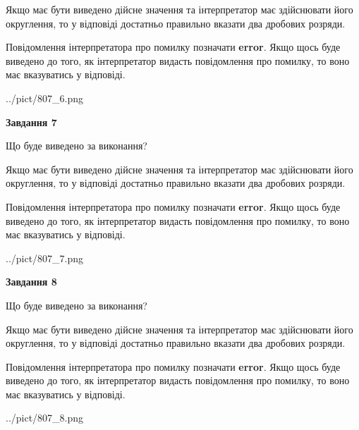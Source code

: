 \documentclass[12pt, ukrainian]{article}
\begin{document}
{\begin {Large}
Якщо має бути виведено дійсне значення та інтерпретатор має здійснювати його округлення, 
то у відповіді достатньо правильно вказати два дробових розряди.

Повідомлення інтерпретатора про помилку позначати \textbf{error}.
Якщо щось буде виведено до того, як інтерпретатор видасть повідомлення про помилку, 
то воно має вказуватись у відповіді. \par

\begin{center}
	{../pict/807_6.png}
\end{center}
\newpage

{\begin {center}\textbf{Завдання 7}\end {center}}\par
Що буде виведено за виконання? \par

Якщо має бути виведено дійсне значення та інтерпретатор має здійснювати його округлення, 
то у відповіді достатньо правильно вказати два дробових розряди.

Повідомлення інтерпретатора про помилку позначати \textbf{error}.
Якщо щось буде виведено до того, як інтерпретатор видасть повідомлення про помилку, 
то воно має вказуватись у відповіді. \par

\begin{center}
	{../pict/807_7.png}
\end{center}
\newpage

{\begin {center}\textbf{Завдання 8}\end {center}}\par
Що буде виведено за виконання? \par

Якщо має бути виведено дійсне значення та інтерпретатор має здійснювати його округлення, 
то у відповіді достатньо правильно вказати два дробових розряди.

Повідомлення інтерпретатора про помилку позначати \textbf{error}.
Якщо щось буде виведено до того, як інтерпретатор видасть повідомлення про помилку, 
то воно має вказуватись у відповіді. \par

\begin{center}
	{../pict/807_8.png}
\end{center}
\newpage


\end{Large}}
\end{document}
